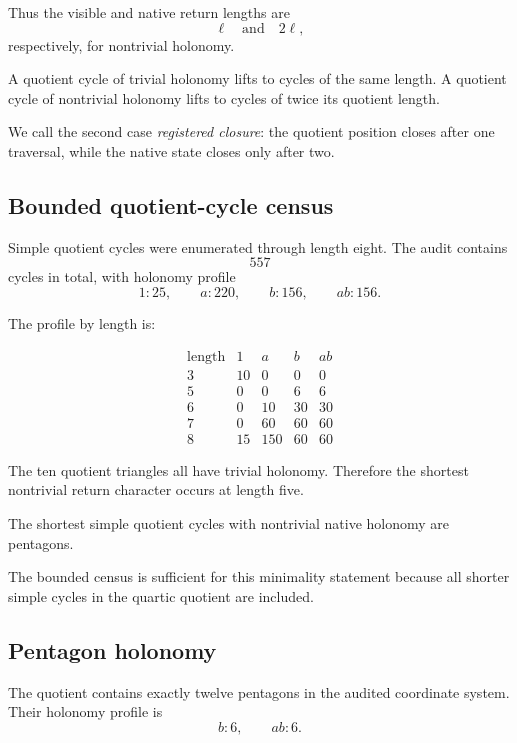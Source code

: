 Thus the visible and native return lengths are
\[
\ell
\quad\text{and}\quad
2\ell,
\]
respectively, for nontrivial holonomy.

\begin{proposition}
A quotient cycle of trivial holonomy lifts to cycles of the same
length. A quotient cycle of nontrivial holonomy lifts to cycles of
twice its quotient length.
\end{proposition}

We call the second case \emph{registered closure}: the quotient
position closes after one traversal, while the native state closes
only after two.

\subsection{Bounded quotient-cycle census}

Simple quotient cycles were enumerated through length eight. The audit
contains
\[
557
\]
cycles in total, with holonomy profile
\[
1:25,
\qquad
a:220,
\qquad
b:156,
\qquad
ab:156.
\]

The profile by length is:

\[
\begin{array}{c|rrrr}
\text{length} & 1 & a & b & ab\\
\hline
3 & 10 & 0 & 0 & 0\\
5 & 0 & 0 & 6 & 6\\
6 & 0 & 10 & 30 & 30\\
7 & 0 & 60 & 60 & 60\\
8 & 15 & 150 & 60 & 60
\end{array}
\]

The ten quotient triangles all have trivial holonomy. Therefore the
shortest nontrivial return character occurs at length five.

\begin{theorem}
The shortest simple quotient cycles with nontrivial native holonomy
are pentagons.
\end{theorem}

The bounded census is sufficient for this minimality statement because
all shorter simple cycles in the quartic quotient are included.

\subsection{Pentagon holonomy}

The quotient contains exactly twelve pentagons in the audited
coordinate system. Their holonomy profile is
\[
b:6,
\qquad
ab:6.
\]

